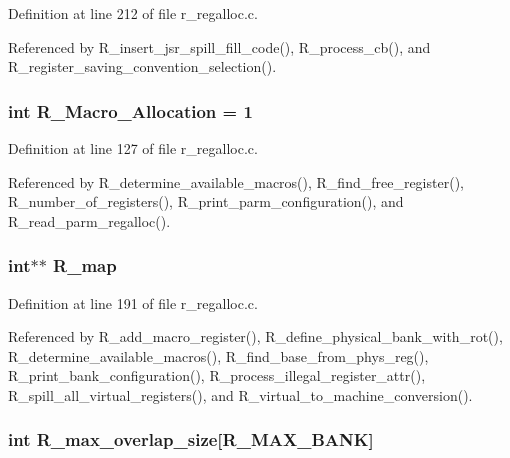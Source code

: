 Definition at line 212 of file r\_\-regalloc.c.

Referenced by R\_\-insert\_\-jsr\_\-spill\_\-fill\_\-code(), R\_\-process\_\-cb(), and R\_\-register\_\-saving\_\-convention\_\-selection().
\subsubsection{\setlength{\rightskip}{0pt plus 5cm}int \bf{R\_\-Macro\_\-Allocation} = 1}\label{r__regalloc_8c_57606c12fb7869c3f4b29009831e885f}




Definition at line 127 of file r\_\-regalloc.c.

Referenced by R\_\-determine\_\-available\_\-macros(), R\_\-find\_\-free\_\-register(), R\_\-number\_\-of\_\-registers(), R\_\-print\_\-parm\_\-configuration(), and R\_\-read\_\-parm\_\-regalloc().
\subsubsection{\setlength{\rightskip}{0pt plus 5cm}int$\ast$$\ast$ \bf{R\_\-map}}\label{r__regalloc_8c_618da4011243399ad7bd81e63f5b1577}




Definition at line 191 of file r\_\-regalloc.c.

Referenced by R\_\-add\_\-macro\_\-register(), R\_\-define\_\-physical\_\-bank\_\-with\_\-rot(), R\_\-determine\_\-available\_\-macros(), R\_\-find\_\-base\_\-from\_\-phys\_\-reg(), R\_\-print\_\-bank\_\-configuration(), R\_\-process\_\-illegal\_\-register\_\-attr(), R\_\-spill\_\-all\_\-virtual\_\-registers(), and R\_\-virtual\_\-to\_\-machine\_\-conversion().
\subsubsection{\setlength{\rightskip}{0pt plus 5cm}int \bf{R\_\-max\_\-overlap\_\-size}[R\_\-MAX\_\-BANK]}\label{r__regalloc_8c_b45cd8d9d1a23c5bd6557f3c9bedf0b0}




